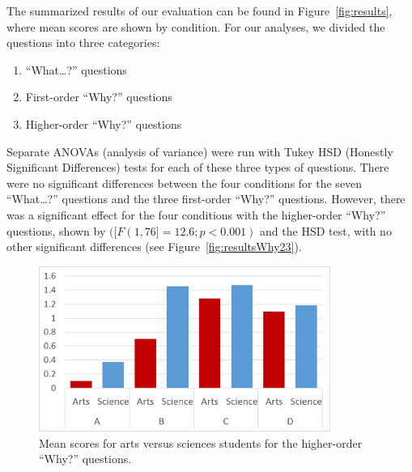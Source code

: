 The summarized results of our evaluation can be found in Figure~\ref{fig:results}, where mean scores are shown by condition.  For our analyses, we divided the questions into three categories:
\begin{enumerate}
\item ``What\ldots?'' questions
\item First-order ``Why?'' questions
\item Higher-order ``Why?'' questions
\end{enumerate}
Separate ANOVAs (analysis of variance) were run with Tukey HSD (Honestly Significant Differences) tests for each of these three types of questions.  There were no significant differences between the four conditions for the seven ``What\ldots?'' questions and the three first-order ``Why?'' questions.    However, there was a significant effect for the four conditions with the higher-order ``Why?'' questions, shown by $([F(1, 76] = 12.6; p < 0.001)$ and the HSD test, with no other significant differences (see Figure~\ref{fig:resultsWhy23}).

\begin{figure}[h]
	\centering
	\includegraphics[width=0.85\textwidth]{figures/png/results_arts_science.png}
	\caption[Mean scores for arts versus sciences students for the higher-order ``Why?'' questions]{Mean scores for arts versus sciences students for the higher-order ``Why?'' questions.}
	\label{fig:results_arts_science}
\end{figure}

